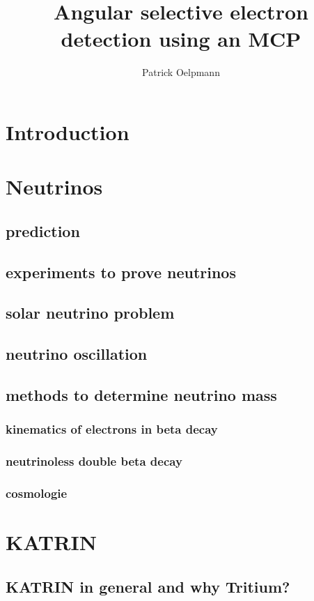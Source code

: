 \documentclass[11pt]{article} %
\title{Angular selective electron detection using an MCP}
\author{Patrick Oelpmann}
\begin{document}
\maketitle
\newpage
\tableofcontents
\newpage

\section{Introduction}

\newpage
\section{Neutrinos}
	\subsection{prediction}
	\subsection{experiments to prove neutrinos}
	\subsection{solar neutrino problem}
	\subsection{neutrino oscillation}
	\subsection{methods to determine neutrino mass}
		\subsubsection{kinematics of electrons in beta decay}
		\subsubsection{neutrinoless double beta decay}
		\subsubsection{cosmologie}




\newpage
\section{KATRIN}
	\subsection{KATRIN in general and why Tritium?}
\end{document}
